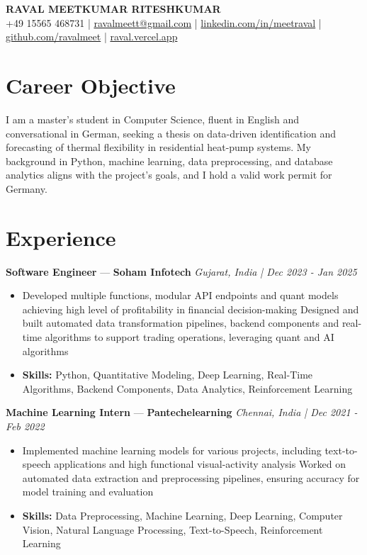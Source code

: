 \documentclass[a4paper,10pt]{article}
\begin{document}
\begin{center}
  {\Large\bfseries RAVAL MEETKUMAR RITESHKUMAR}\\[2pt]
  {\small +49 15565 468731 \;|\; \href{mailto:ravalmeett@gmail.com}{ravalmeett@gmail.com} \;|\; \href{https://www.linkedin.com/in/meetraval/}{linkedin.com/in/meetraval} \;|\; \href{https://github.com/ravalmeet}{github.com/ravalmeet} \;|\; \href{https://raval.vercel.app/}{raval.vercel.app}}
\end{center}
\vspace{-3pt}

\section*{Career Objective}
I am a master's student in Computer Science, fluent in English and conversational in German, seeking a thesis on data-driven identification and forecasting of thermal flexibility in residential heat-pump systems. My background in Python, machine learning, data preprocessing, and database analytics aligns with the project's goals, and I hold a valid work permit for Germany.\par

\section*{Experience}
\textbf{Software Engineer} — \textbf{Soham Infotech} \hfill \textit{Gujarat, India \;|\; Dec 2023 - Jan 2025}\par
\vspace{1pt}
\begin{itemize}
  \item Developed multiple functions, modular API endpoints and quant models achieving high level of profitability in financial decision-making Designed and built automated data transformation pipelines, backend components and real-time algorithms to support trading operations, leveraging quant and AI algorithms
  \item \textbf{Skills:} Python, Quantitative Modeling, Deep Learning, Real-Time Algorithms, Backend Components, Data Analytics, Reinforcement Learning
\end{itemize}
\vspace{3pt}
\textbf{Machine Learning Intern} — \textbf{Pantechelearning} \hfill \textit{Chennai, India \;|\; Dec 2021 - Feb 2022}\par
\vspace{1pt}
\begin{itemize}
  \item Implemented machine learning models for various projects, including text-to-speech applications and high functional visual-activity analysis Worked on automated data extraction and preprocessing pipelines, ensuring accuracy for model training and evaluation
  \item \textbf{Skills:} Data Preprocessing, Machine Learning, Deep Learning, Computer Vision, Natural Language Processing, Text-to-Speech, Reinforcement Learning
\end{itemize}
\end{document}
